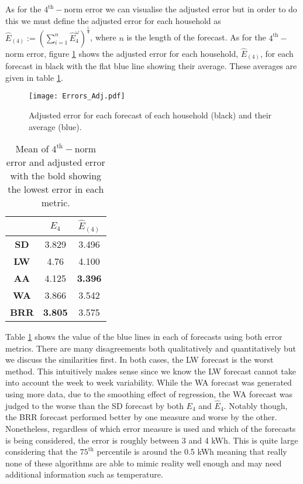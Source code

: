 As for the $4^{\text{th}}-$norm error we can visualise the adjusted error but in order to do this we must define the adjusted error for each household as $\hat{E}_{(4)} := \left( \sum_{i=1}^{n} \hat{E}_4^\omega\right)^{\frac{1}{4}}$, where $n$ is the length of the forecast. As for the $4^{\text{th}}-$norm error, figure \ref{fig:Adj_err_all} shows the adjusted error for each household, $\hat{E}_{(4)}$, for each forecast in black with the flat blue line showing their average. These averages are given in table \ref{tab:errs}.

\begin{figure}
\centering
\texttt{[image: Errors\_Adj.pdf]}
\caption{\label{fig:Adj_err_all} Adjusted error for each forecast of each household (black) and their average (blue).}
\end{figure}


\begin{table}
\centering
\begin{tabular}{|c|c|c|}
\hline
 & $E_4$ & $\hat{E}_{(4)}$ \\
 \hline
\textbf{SD} & 3.829 & 3.496 \\
\textbf{LW} & 4.76 & 4.100 \\ 
\textbf{AA} & 4.125 & \textbf{3.396} \\ 
\textbf{WA} & 3.866 & 3.542 \\ 
\textbf{BRR} & \textbf{3.805} & 3.575 \\
\hline
\end{tabular}
\caption{Mean of $4^{\text{th}}-$norm error and adjusted error with the bold showing the lowest error in each metric.}
\label{tab:errs}
\end{table}


Table \ref{tab:errs} shows the value of the blue lines in each of forecasts using both error metrics. There are many disagreements both qualitatively and quantitatively but we discuss the similarities first. In both cases, the LW forecast is the worst method. This intuitively makes sense since we know the LW forecast cannot take into account the week to week variability. While the WA forecast was generated using more data, due to the smoothing effect of regression, the WA forecast was judged to the worse than the SD forecast by both $E_4$ and $\hat{E}_4$. Notably though, the BRR forecast performed better by one measure and worse by the other. Nonetheless, regardless of which error measure is used and which of the forecasts is being considered, the error is  roughly between 3 and 4 kWh. This is quite large considering that the $75^{\text{th}}$ percentile is around the 0.5 kWh meaning that really none of these algorithms are able to mimic reality well enough and may need additional information such as temperature.

